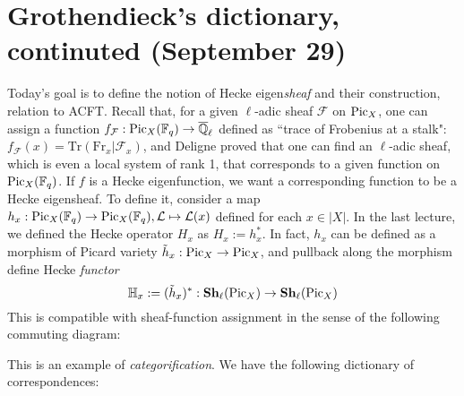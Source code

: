\newpage
\section{Grothendieck's dictionary, continuted (September 29)}

Today's goal is to define the notion of Hecke eigen\emph{sheaf} and their construction, relation to ACFT.
Recall that, for a given $\ell$-adic sheaf $\mathcal{F}$ on $\operatorname{\mathrm{Pic}}_X$, 
one can assign a function $f_{\mathcal{F}}: \operatorname{\mathrm{Pic}}_X(\mathbb{F}_q) \to \overline{\mathbb{Q}}_{\ell}$
defined as ``trace of Frobenius at a stalk": $f_{\mathcal{F}}(x) = \mathrm{Tr}(\mathrm{Fr}_{x}|\mathcal{F}_{x})$,
and Deligne proved that one can find an $\ell$-adic sheaf, which is even a local system of rank 1, that corresponds to a given function on $\operatorname{\mathrm{Pic}}_X(\mathbb{F}_{q})$.
If $f$ is a Hecke eigenfunction, we want a corresponding function to be a Hecke eigensheaf.
To define it, consider a map $h_{x}: \operatorname{\mathrm{Pic}}_X(\mathbb{F}_{q}) \to \operatorname{\mathrm{Pic}}_X(\mathbb{F}_{q}), \mathcal{L}\mapsto \mathcal{L}(x)$
defined for each $x \in |X|$.
In the last lecture, we defined the Hecke operator $H_{x}$ as $H_{x}:= h_{x}^{*}$.
In fact, $h_{x}$ can be defined as a morphism of Picard variety $\tilde{h}_{x}: \operatorname{\mathrm{Pic}}_X \to \operatorname{\mathrm{Pic}}_X$,
and pullback along the morphism define Hecke \emph{functor}
$$
\mathbb{H}_{x}:= (\tilde{h}_{x})^{*}: \mathbf{Sh}_{\ell}(\operatorname{\mathrm{Pic}}_X) \to \mathbf{Sh}_{\ell}(\operatorname{\mathrm{Pic}}_X)
$$
This is compatible with sheaf-function assignment in the sense of the following commuting diagram:
\begin{center}
\end{center}
This is an example of \emph{categorification}. We have the following dictionary of correspondences:
\begin{center}
    
\end{center}

